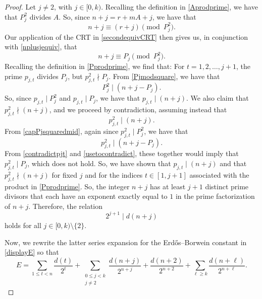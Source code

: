 \documentclass[12pt]{article}
\begin{document}
\begin{proof}
 Let $j \neq 2$, with $j \in [0, k)$. Recalling the definition in \eqref{Aprodprime}, we have that $P_j^2$ divides $A$. So, since $n+j = r + 
 m A +j$, we have that 
\begin{equation}\label{nplusjequiv} 
 n + j \equiv (r+j) \pmod {P_j^2}. 
\end{equation}
 Our application of the CRT in \eqref{secondequivCRT} then gives us, in conjunction with 
 \eqref{nplusjequiv}, that 
\begin{equation}\label{Pjmodsquare} 
 n + j \equiv P_j \pmod {P_{j}^{2}}. 
\end{equation} 
 Recalling the definition in \eqref{Pprodprime}, we find that: For $t = 1, 2, \ldots, j+1$, the prime $p_{j, t}$ divides $P_j$, but $p_{j, t}^2 
 \nmid P_j$. From \eqref{Pjmodsquare}, we have that 
\begin{equation}\label{capPjsquaredmid}
 P_j^2 \mid (n + j - P_j). 
\end{equation}
 So, since $p_{j, t} \mid P_j^2$ and $p_{j, t} \mid P_j$, we have that $p_{j, t} \mid (n + j)$. We also claim that $p_{j, t}^{2} \nmid (n+j)$, 
 and we proceed by contradiction,  assuming instead that 
\begin{equation}\label{contradictpjt} 
 p_{j, t}^{2} \mid (n+j).
\end{equation} 
 From \eqref{capPjsquaredmid}, again since $p_{j, t}^2 \mid P_{j}^2$, we have that 
\begin{equation}\label{usetocontradict} 
 p_{j, t}^2 \mid (n + j - P_j). 
\end{equation}
 From \eqref{contradictpjt} and \eqref{usetocontradict}, these together would imply that $p_{j, t}^{2} \mid P_j$, which does not hold. 
 So, we have shown that $p_{j, t} \mid (n + j)$ and that $p_{j, t}^{2} \nmid (n + j)$ for fixed $j$ and for the indices $t \in [1, j+1]$ 
 associated with the product in \eqref{Pprodprime}. So, the integer $n+j$ has at least $j+1$ distinct prime divisors that each have an 
 exponent exactly equal to $1$ in the prime factorization of $n + j$. Therefore, the relation 
\begin{equation}\label{2jplus1mid} 
 2^{j+1} \mid d(n+j) 
\end{equation}
 holds for all $j \in [0, k) \setminus \{2 \}$.

 Now, we rewrite the latter series expansion for the Erd\H{o}s--Borwein constant in \eqref{displayE} so that 
\begin{equation}\label{rewriteE}
 E = \sum_{1 \leq t < n} \frac{d(t)}{2^t} + \sum_{\substack{0\leq j < k \\ j \neq 2}} \frac{d(n+j)}{2^{n+j}} + \frac{d(n+2)}{2^{n + 
 2}} + \sum_{\ell \geq k} \frac{d(n +\ell)}{2^{n + \ell}}. 
\end{equation}


\end{proof}
\end{document}
